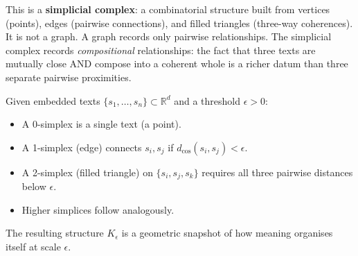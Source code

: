 \documentclass[12pt,a4paper]{article}
\begin{document}
\begin{center}
\end{center}

This is a \textbf{simplicial complex}: a combinatorial structure built from vertices (points), edges (pairwise connections), and filled triangles (three-way coherences). It is not a graph. A graph records only pairwise relationships. The simplicial complex records \emph{compositional} relationships: the fact that three texts are mutually close AND compose into a coherent whole is a richer datum than three separate pairwise proximities.

\begin{formalbox}[title={Simplicial Complex from Embeddings}]
Given embedded texts $\{s_1, \ldots, s_n\} \subset \mathbb{R}^d$ and a threshold $\epsilon > 0$:
\begin{itemize}
\item A 0-simplex is a single text (a point).
\item A 1-simplex (edge) connects $s_i, s_j$ if $d_{\cos}(s_i, s_j) < \epsilon$.
\item A 2-simplex (filled triangle) on $\{s_i, s_j, s_k\}$ requires all three pairwise distances below $\epsilon$.
\item Higher simplices follow analogously.
\end{itemize}
The resulting structure $K_\epsilon$ is a geometric snapshot of how meaning organises itself at scale $\epsilon$.
\end{formalbox}
\end{document}
